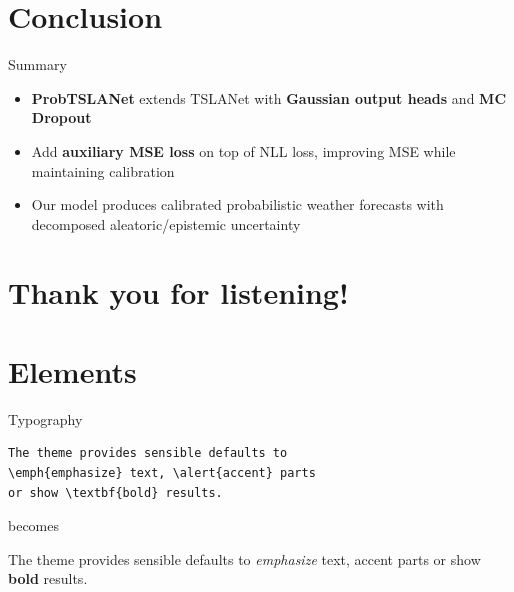 \documentclass[10pt]{beamer}
\begin{document}




\section{Conclusion}

\begin{frame}[fragile]{Summary} 

  \begin{itemize}
      \item \textbf{ProbTSLANet} extends TSLANet with \textbf{Gaussian output heads} and \textbf{MC Dropout}
  \end{itemize}
\begin{itemize}
    \item Add \textbf{auxiliary MSE loss} on top of NLL loss, improving MSE while maintaining calibration

\end{itemize}
\begin{itemize}

    \item Our model produces calibrated probabilistic weather forecasts with decomposed aleatoric/epistemic uncertainty
\end{itemize}



\end{frame}






\section{Thank you for listening!}










\section{Elements}

\begin{frame}[fragile]{Typography}
      \begin{verbatim}The theme provides sensible defaults to
\emph{emphasize} text, \alert{accent} parts
or show \textbf{bold} results.\end{verbatim}

  \begin{center}becomes\end{center}

  The theme provides sensible defaults to \emph{emphasize} text,
  \alert{accent} parts or show \textbf{bold} results.
\end{frame}
\end{document}
